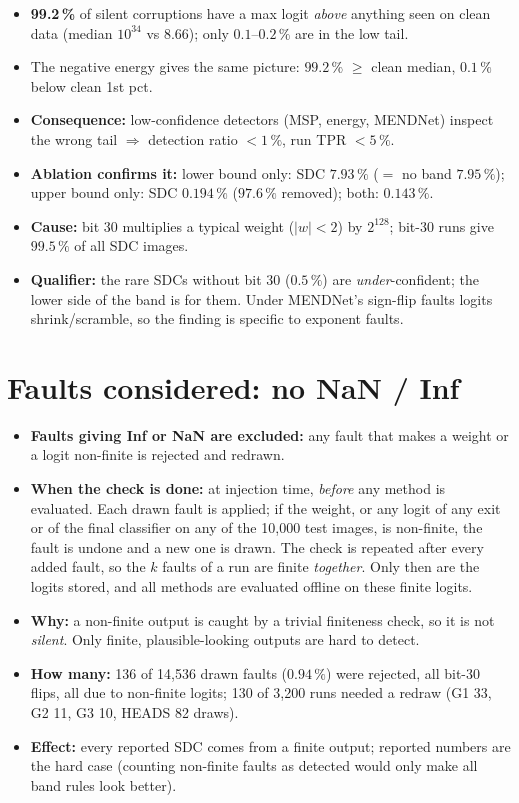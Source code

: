 \documentclass[10pt,a4paper]{article}
\begin{document}
\begin{itemize}
  \item \textbf{99.2\,\%} of silent corruptions have a max logit \emph{above} anything seen on clean data
        (median $10^{34}$ vs $8.66$); only $0.1$--$0.2\,\%$ are in the low tail.
  \item The negative energy gives the same picture: $99.2\,\%$ $\ge$ clean median, $0.1\,\%$ below clean 1st pct.
  \item \textbf{Consequence:} low-confidence detectors (MSP, energy, MENDNet) inspect the wrong tail
        $\Rightarrow$ detection ratio $<1\,\%$, run TPR $<5\,\%$.
  \item \textbf{Ablation confirms it:} lower bound only: SDC $7.93\,\%$ ($=$ no band $7.95\,\%$);
        upper bound only: SDC $0.194\,\%$ ($97.6\,\%$ removed); both: $0.143\,\%$.
  \item \textbf{Cause:} bit 30 multiplies a typical weight ($|w|<2$) by $2^{128}$; bit-30 runs give
        $99.5\,\%$ of all SDC images.
  \item \textbf{Qualifier:} the rare SDCs without bit 30 ($0.5\,\%$) are \emph{under}-confident; the lower side of
        the band is for them. Under MENDNet's sign-flip faults logits shrink/scramble, so the finding is specific
        to exponent faults.
\end{itemize}

\section{Faults considered: no NaN / Inf}

\begin{itemize}
  \item \textbf{Faults giving Inf or NaN are excluded:} any fault that makes a weight or a logit non-finite is
        rejected and redrawn.
  \item \textbf{When the check is done:} at injection time, \emph{before} any method is evaluated. Each drawn
        fault is applied; if the weight, or any logit of any exit or of the final classifier on any of the
        10{,}000 test images, is non-finite, the fault is undone and a new one is drawn. The check is repeated
        after every added fault, so the $k$ faults of a run are finite \emph{together}. Only then are the logits
        stored, and all methods are evaluated offline on these finite logits.
  \item \textbf{Why:} a non-finite output is caught by a trivial finiteness check, so it is not \emph{silent}.
        Only finite, plausible-looking outputs are hard to detect.
  \item \textbf{How many:} 136 of 14{,}536 drawn faults ($0.94\,\%$) were rejected, all bit-30 flips, all due to
        non-finite logits; 130 of 3{,}200 runs needed a redraw (G1 33, G2 11, G3 10, HEADS 82 draws).
  \item \textbf{Effect:} every reported SDC comes from a finite output; reported numbers are the hard case
        (counting non-finite faults as detected would only make all band rules look better).
\end{itemize}
\end{document}
